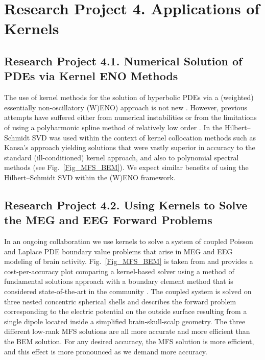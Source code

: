 \documentclass[11pt]{NSFamsart}
\begin{document}
\section*{Research Project 4. Applications of Kernels}
\label{appsec}
\subsection*{Research Project 4.1. Numerical Solution of PDEs via Kernel ENO Methods}  \label{PDEsubsec}
The use of kernel methods for the solution of hyperbolic PDEs via a (weighted) essentially non-oscillatory (W)ENO) approach is not new \citep{CecilEtAl04,IskeSonar96}. However, previous attempts have suffered either from numerical instabilities \citep{CecilEtAl04} or from the limitations of using a polyharmonic spline method of relatively low order \citep{IskeSonar96}. In \citep{McCourt13} the Hilbert--Schmidt SVD was used within the context of kernel collocation methods such as Kansa's approach \citep{Fas07a} yielding solutions that were vastly superior in accuracy to the standard (ill-conditioned) kernel approach, and also to polynomial spectral methods (see Fig.~\ref{Fig_MFS_BEM}). We expect similar benefits of using the Hilbert--Schmidt SVD within the (W)ENO framework.

\subsection*{Research Project 4.2. Using Kernels to Solve the MEG and EEG Forward Problems} \label{SectMEEG}
In an ongoing collaboration we use kernels to solve a system of coupled Poisson and Laplace PDE boundary value problems that arise in MEG and EEG modeling of brain activity. Fig.~\ref{Fig_MFS_BEM} is taken from \citep{AFFGM13} and provides a cost-per-accuracy plot comparing a kernel-based solver using a method of fundamental solutions approach with a boundary element method that is considered state-of-the-art in the community \citep{fieldtrip11}. The coupled system is solved on three nested concentric spherical shells and describes the forward problem corresponding to the electric potential on the outside surface resulting from a single dipole located inside a simplified brain-skull-scalp geometry. The three different low-rank MFS solutions are all more accurate and more efficient than the BEM solution. For any desired accuracy, the MFS solution is more efficient, and this effect is more pronounced as we demand more accuracy.
\end{document}
